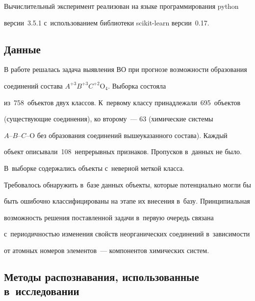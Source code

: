   Вычислительный эксперимент реализован на языке программирования python 

версии~3.5.1 с~использованием библиотеки scikit-learn версии~0.17.

  

\subsection{Данные}



В работе решалась задача выявления ВО при прогнозе возможности образования 

соединений состава $A^{+3}B^{+3}C^{+2}\mathrm{O}_4$. Выборка состояла 

из~758~объектов двух классов. К~первому классу принадлежали~695~объектов 

(существующие соединения), ко второму~--- 63 (химические системы  

$A$--$B$--$C$--$\mathrm{O}$ без образования соединений вышеуказанного состава). Каждый 

объект описывали~108~непрерывных признаков. Пропусков в~данных не было. 

В~выборке содержались объекты с~неверной меткой класса.



Требовалось обнаружить в~базе данных объекты, которые потенциально могли бы 

быть ошибочно классифицированы на этапе их внесения в~базу. Принципиальная 

возможность решения поставленной задачи в~первую очередь связана 

с~периодичностью изменения свойств неорганических соединений в~зависимости 

от атомных номеров элементов~--- компонентов химических систем. 



\subsection{Методы распознавания, использованные в~исследовании}



\renewcommand{\figurename}{\protect\bf Таблица}





